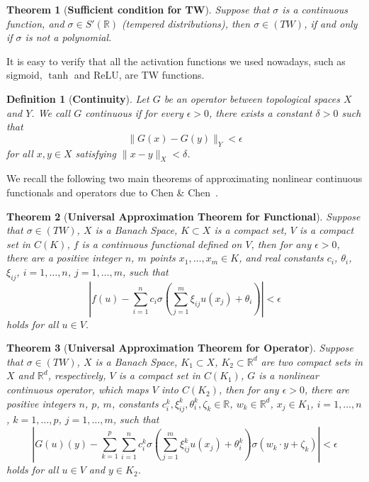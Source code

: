 \documentclass[11pt]{article}
\newtheorem{theorem}{Theorem}
\newtheorem{definition}{Definition}
\begin{document}
\begin{theorem}[\textbf{Sufficient condition for TW}]
Suppose that $\sigma$ is a continuous function, and $\sigma \in S'(\mathbb{R})$ (tempered distributions), then $\sigma \in (TW)$, if and only if $\sigma$ is not a polynomial.
\end{theorem}

It is easy to verify that all the activation functions we used nowadays, such as sigmoid, $\tanh$ and ReLU, are TW functions.

\begin{definition}[\textbf{Continuity}]
Let $G$ be an operator between topological spaces $X$ and $Y$. We call $G$ continuous if for every $\epsilon > 0$, there exists a constant $\delta >0$ such that
$$\|G(x)-G(y)\|_Y < \epsilon$$
for all $x, y \in X$ satisfying $\|x-y\|_X < \delta$.
\end{definition}

We recall the following two main theorems of approximating nonlinear continuous functionals and operators due to Chen \& Chen~\cite{chen1995universal}.

\begin{theorem}[\textbf{Universal Approximation Theorem for Functional}]
\label{thm:functional}
Suppose that $\sigma \in (TW)$, $X$ is a Banach Space, $K \subset X$ is a compact set, $V$ is a compact set in $C(K)$, $f$ is a continuous functional defined on $V$, then for any $\epsilon > 0$, there are a positive integer $n$, $m$ points $x_1, \dots, x_m \in K$, and real constants $c_i$, $\theta_i$, $\xi_{ij}$, $i=1,\dots,n$, $j=1,\dots,m$, such that
$$\left|f(u) - \sum_{i=1}^n c_i \sigma\left(\sum_{j=1}^m \xi_{ij}u(x_j)+\theta_i\right)\right|<\epsilon$$
holds for all $u \in V$.
\end{theorem}

\begin{theorem}[\textbf{Universal Approximation Theorem for Operator}]
\label{thm:operator}
Suppose that $\sigma \in (TW)$, $X$ is a Banach Space, $K_1 \subset X$, $K_2 \subset \mathbb{R}^d$ are two compact sets in $X$ and $\mathbb{R}^d$, respectively, $V$ is a compact set in $C(K_1)$, $G$ is a nonlinear continuous operator, which maps $V$ into $C(K_2)$, then for any $\epsilon>0$, there are positive integers $n$, $p$, $m$, constants $c_i^k, \xi_{ij}^k, \theta_i^k, \zeta_k \in \mathbb{R}$, $w_k \in \mathbb{R}^d$, $x_j \in K_1$, $i=1,\dots,n$, $k=1,\dots,p$, $j=1,\dots,m$, such that
$$\left|G(u)(y) - \sum_{k=1}^p\sum_{i=1}^n c_i^k \sigma\left(\sum_{j=1}^m \xi_{ij}^ku(x_j)+\theta_i^k\right)\sigma(w_k \cdot y+\zeta_k) \right|<\epsilon$$
holds for all $u \in V$ and $y \in K_2$.
\end{theorem}
\end{document}
